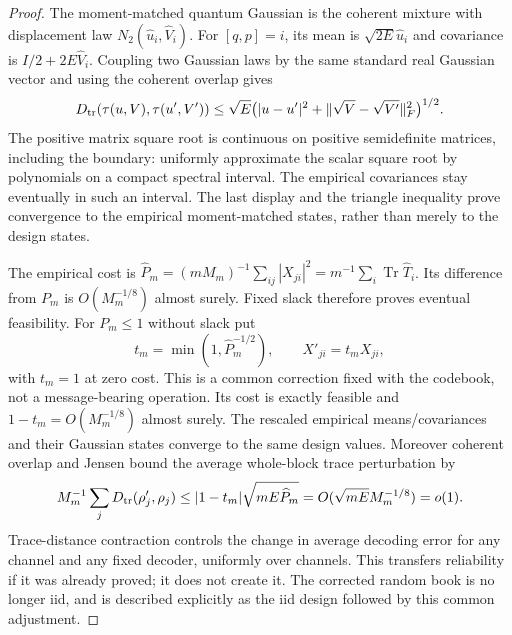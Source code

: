 \documentclass[11pt]{article}
\newcommand{\Tr}{\operatorname{Tr}}
\begin{document}
\begin{proof}
The moment-matched quantum Gaussian is the coherent mixture with
displacement law \(N_2(\widehat u_i,\widehat V_i)\).
For \([q,p]=i\), its mean is \(\sqrt{2E}\widehat u_i\) and covariance
is \(I/2+2E\widehat V_i\). Coupling two Gaussian laws by the same
standard real Gaussian vector and using the coherent overlap gives
\[
 D_{\rm tr}(\tau(u,V),\tau(u',V'))
 \leq\sqrt E\bigl(|u-u'|^2+
             \|\sqrt V-\sqrt{V'}\|_F^2\bigr)^{1/2}.
\]
The positive matrix square root is continuous on positive semidefinite
matrices, including the boundary: uniformly approximate the scalar square
root by polynomials on a compact spectral interval. The empirical
covariances stay eventually in such an interval. The last display and
the triangle inequality prove convergence to the empirical moment-matched
states, rather than merely to the design states.

The empirical cost is
\(\widehat P_m=(mM_m)^{-1}\sum_{ij}|X_{ji}|^2
=m^{-1}\sum_i\Tr\widehat T_i\).
Its difference from \(P_m\) is \(O(M_m^{-1/8})\) almost surely.
Fixed slack therefore proves eventual feasibility. For \(P_m\leq1\)
without slack put
\[
 t_m=\min(1,\widehat P_m^{-1/2}),\qquad X'_{ji}=t_mX_{ji},
\]
with \(t_m=1\) at zero cost. This is a common correction fixed with
the codebook, not a message-bearing operation. Its cost is exactly
feasible and \(1-t_m=O(M_m^{-1/8})\) almost surely.
The rescaled empirical means/covariances and their Gaussian states
converge to the same design values. Moreover coherent overlap and Jensen
bound the average whole-block trace perturbation by
\[
 M_m^{-1}\sum_jD_{\rm tr}(\rho'_j,\rho_j)
 \leq |1-t_m|\sqrt{mE\widehat P_m}
 =O(\sqrt{mE}M_m^{-1/8})=o(1).
\]
Trace-distance contraction controls the change in average decoding error
for any channel and any fixed decoder, uniformly over channels.
This transfers reliability if it was already proved; it does not create
it. The corrected random book is no longer iid, and is described
explicitly as the iid design followed by this common adjustment.
\end{proof}
\end{document}
